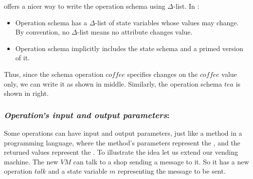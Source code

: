 \begin{itemize}


\oz{} offers a nicer way to write the operation schema using $\Delta$-list. In \oz{}:
\begin{itemize}
\item Operation schema has a $\Delta$-list of state variables
whose values may change. By convention, no $\Delta$-list means
no attribute changes value.
\item Operation schema implicitly
includes the state schema and a primed version of it.
\end{itemize}
Thus, since the schema operation $coffee$ specifies changes on the $coffee$ value only, we can write it as shown in  middle. 
Similarly, the operation schema $tea$ is shown in  right.
\end{itemize}

\subsubsection{\textit{Operation's input and output parameters}:} 
\label{operation_input_output_parameters} 
Some operations can have input and output parameters, just like a method in a programming language, where the method's parameters represent the , and the returned values represent the . To illustrate the idea let us extend our vending machine. The new $VM$ can talk to a shop sending a message to it. So it has a new operation $talk$ and a state variable $m$ representing the message to be sent.

